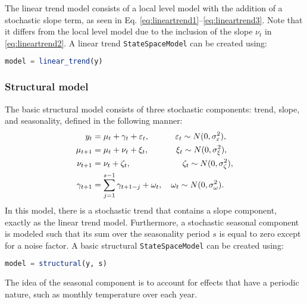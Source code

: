 \documentclass{juliacon}
\begin{document}
The linear trend model consists of a local level model with the addition of a stochastic slope term, as seen in Eq. \eqref{eq:lineartrend1}--\eqref{eq:lineartrend3}. Note that it differs from the local level model due to the inclusion of the slope $\nu_{t}$ in \eqref{eq:lineartrend2}. A linear trend \texttt{StateSpaceModel} can be created using:
%
\begin{lstlisting}[language = Julia]
model = linear_trend(y)
\end{lstlisting}

\subsubsection{Structural model}

The basic structural model consists of three stochastic components: trend, slope, and seasonality, defined in the following manner:
%
\begin{align}
    y_{t} &= \mu_{t} + \gamma_{t} + \varepsilon_{t}, \hspace{0.09\columnwidth} \varepsilon_{t} \sim N(0, \sigma^{2}_\varepsilon), \label{eq:structural1} \\
    \mu_{t+1} &= \mu_{t} + \nu_{t} + \xi_{t}, \hspace{0.095\columnwidth} \xi_{t} \sim N(0, \sigma^{2}_\xi), \label{eq:structural2} \\
    \nu_{t+1} &= \nu_{t} + \zeta_{t}, \hspace{0.18\columnwidth} \zeta_{t} \sim N(0, \sigma^{2}_\zeta), \label{eq:structural3} \\
    \gamma_{t+1} &= \sum_{j=1}^{s-1} \gamma_{t+1-j} + \omega_{t}, \quad \omega_{t} \sim N(0, \sigma^{2}_\omega). \label{eq:structural4}
\end{align}
%
In this model, there is a stochastic trend that contains a slope component, exactly as the linear trend model. Furthermore, a stochastic seasonal component is modeled such that its sum over the seasonality period $s$ is equal to zero except for a noise factor. A basic structural \texttt{StateSpaceModel} can be created using:
%
\begin{lstlisting}[language = Julia]
model = structural(y, s)
\end{lstlisting}

The idea of the seasonal component is to account for effects that have a periodic nature, such as monthly temperature over each year.
\end{document}

